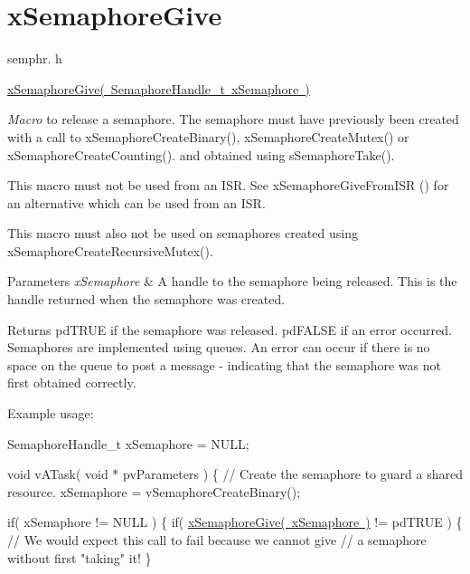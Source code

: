 \hypertarget{group__x_semaphore_give}{}\section{x\+Semaphore\+Give}
\label{group__x_semaphore_give}
semphr. h 
\begin{DoxyPre}\mbox{\hyperlink{semphr_8h_aae55761cabfa9bf85c8f4430f78c0953}{xSemaphoreGive( SemaphoreHandle\_t xSemaphore )}}\end{DoxyPre}


{\itshape Macro} to release a semaphore. The semaphore must have previously been created with a call to x\+Semaphore\+Create\+Binary(), x\+Semaphore\+Create\+Mutex() or x\+Semaphore\+Create\+Counting(). and obtained using s\+Semaphore\+Take().

This macro must not be used from an I\+SR. See x\+Semaphore\+Give\+From\+I\+SR () for an alternative which can be used from an I\+SR.

This macro must also not be used on semaphores created using x\+Semaphore\+Create\+Recursive\+Mutex().


\begin{DoxyParams}{Parameters}
{\em x\+Semaphore} & A handle to the semaphore being released. This is the handle returned when the semaphore was created.\\
\hline
\end{DoxyParams}
\begin{DoxyReturn}{Returns}
pd\+T\+R\+UE if the semaphore was released. pd\+F\+A\+L\+SE if an error occurred. Semaphores are implemented using queues. An error can occur if there is no space on the queue to post a message -\/ indicating that the semaphore was not first obtained correctly.
\end{DoxyReturn}
Example usage\+: 
\begin{DoxyPre}
SemaphoreHandle\_t xSemaphore = NULL;\end{DoxyPre}



\begin{DoxyPre}void vATask( void * pvParameters )
\{
   // Create the semaphore to guard a shared resource.
   xSemaphore = vSemaphoreCreateBinary();\end{DoxyPre}



\begin{DoxyPre}   if( xSemaphore != NULL )
   \{
       if( \mbox{\hyperlink{semphr_8h_aae55761cabfa9bf85c8f4430f78c0953}{xSemaphoreGive( xSemaphore )}} != pdTRUE )
       \{
           // We would expect this call to fail because we cannot give
           // a semaphore without first "taking" it!
       \}\end{DoxyPre}



